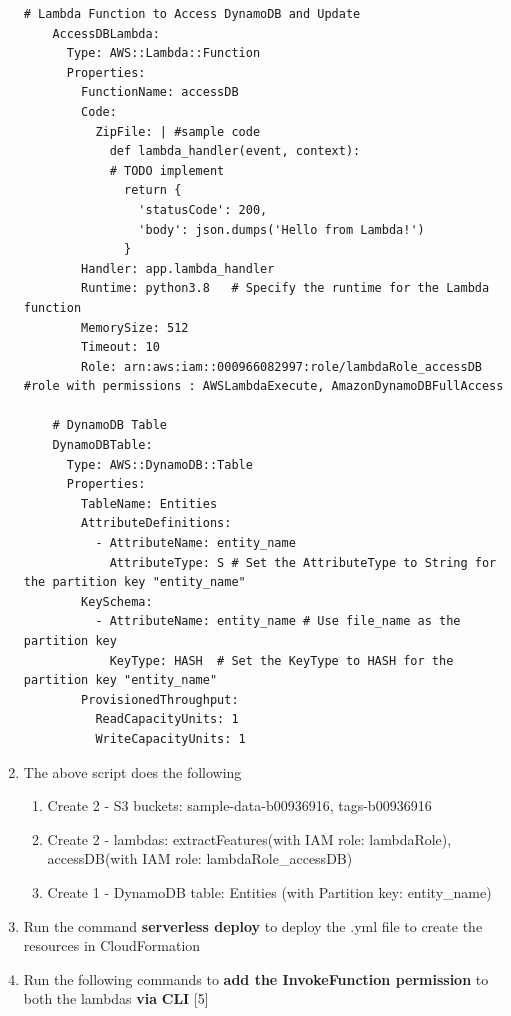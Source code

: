 \begin{enumerate}
\begin{mdframed}[linewidth=1pt]
\begin{lstlisting}[basicstyle=\ttfamily\small, breaklines=true]
    # Lambda Function to Access DynamoDB and Update
    AccessDBLambda:
      Type: AWS::Lambda::Function
      Properties:
        FunctionName: accessDB
        Code:
          ZipFile: | #sample code
            def lambda_handler(event, context):
            # TODO implement
              return {
                'statusCode': 200,
                'body': json.dumps('Hello from Lambda!')
              }
        Handler: app.lambda_handler
        Runtime: python3.8   # Specify the runtime for the Lambda function
        MemorySize: 512
        Timeout: 10
        Role: arn:aws:iam::000966082997:role/lambdaRole_accessDB #role with permissions : AWSLambdaExecute, AmazonDynamoDBFullAccess

    # DynamoDB Table
    DynamoDBTable:
      Type: AWS::DynamoDB::Table
      Properties:
        TableName: Entities
        AttributeDefinitions:
          - AttributeName: entity_name
            AttributeType: S # Set the AttributeType to String for the partition key "entity_name"
        KeySchema:
          - AttributeName: entity_name # Use file_name as the partition key
            KeyType: HASH  # Set the KeyType to HASH for the partition key "entity_name"
        ProvisionedThroughput:
          ReadCapacityUnits: 1
          WriteCapacityUnits: 1
\end{lstlisting}
\end{mdframed}

\item The above script does the following
\begin{enumerate}
    \item Create 2 - S3 buckets: sample-data-b00936916, tags-b00936916 
    \item Create 2 - lambdas: extractFeatures(with IAM role: lambdaRole), accessDB(with IAM role: lambdaRole\_accessDB)
    \item Create 1 - DynamoDB table: Entities (with Partition key: entity\_name)
\end{enumerate}

\item Run the command \textbf{serverless deploy} to deploy the .yml file to create the resources in CloudFormation 

        \item Run the following commands to \textbf{add the InvokeFunction permission} to both the lambdas \textbf{via} \textbf{CLI} [5]


\end{enumerate}
